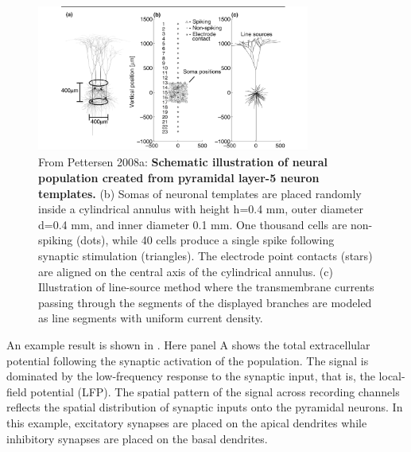 \begin{figure}[!ht]
\begin{center}
\includegraphics[width=0.8\textwidth]{Figures/Spikes/MUA-2}
\end{center}
\caption[]{
From Pettersen 2008a: \textbf{Schematic illustration of neural population created from pyramidal layer-5 neuron templates.} (b) Somas of neuronal templates are placed randomly inside a cylindrical annulus with height h=0.4 mm, outer diameter d=0.4 mm, and inner diameter 0.1 mm. One thousand cells are non-spiking (dots), while 40 cells produce a single spike following synaptic stimulation (triangles). The electrode point contacts (stars) are aligned on the central axis of the cylindrical annulus. (c) Illustration of line-source method where the transmembrane currents passing through the 
segments of the displayed branches are modeled as line segments with uniform current density.}
\label{fig:Spikes:MUA-population}
\end{figure}

An example result is shown in . Here panel A shows the total extracellular potential following the synaptic activation of the population. The signal is dominated by the low-frequency response to the synaptic input, that is, the local-field potential (LFP). The spatial pattern of the signal across recording channels reflects the
spatial distribution of synaptic inputs onto the pyramidal neurons. In this example, excitatory synapses are placed on the apical dendrites while inhibitory synapses are placed on the basal dendrites. 

